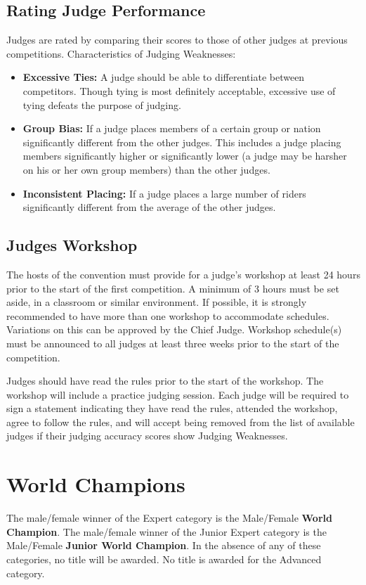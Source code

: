\subsection{Rating Judge Performance}
Judges are rated by comparing their scores to those of other judges at previous competitions.
Characteristics of Judging Weaknesses:
\begin{itemize}
\item \textbf{Excessive Ties:}
A judge should be able to differentiate between competitors.
Though tying is most definitely acceptable, excessive use of tying defeats the purpose of judging.
\item \textbf{Group Bias:}
If a judge places members of a certain group or nation significantly different from the other judges.
This includes a judge placing members significantly higher or significantly lower (a judge may be harsher on his or her own group members) than the other judges.
\item\textbf{Inconsistent Placing:}
If a judge places a large number of riders significantly different from the average of the other judges.
\end{itemize}

\subsection{Judges Workshop}
The hosts of the convention must provide for a judge's workshop at least 24 hours prior to the start of the first competition.
A minimum of 3 hours must be set aside, in a classroom or similar environment.
If possible, it is strongly recommended to have more than one workshop to accommodate schedules.
Variations on this can be approved by the Chief Judge.
Workshop schedule(s) must be announced to all judges at least three weeks prior to the start of the competition.

Judges should have read the rules prior to the start of the workshop.
The workshop will include a practice judging session.
Each judge will be required to sign a statement indicating they have read the rules, attended the workshop, agree to follow the rules, and will accept being removed from the list of available judges if their judging accuracy scores show Judging Weaknesses.

\section{World Champions}
The male/female winner of the Expert category is the Male/Female \textbf{World Champion}.
The male/female winner of the Junior Expert category is the Male/Female \textbf{Junior World Champion}.
In the absence of any of these categories, no title will be awarded.
No title is awarded for the Advanced category.

